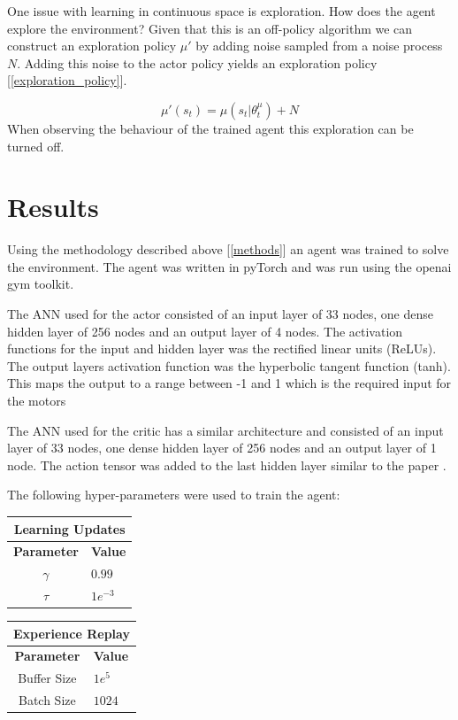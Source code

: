 \documentclass[12pt]{article}
\begin{document}
One issue with learning in continuous space is exploration.
How does the agent explore the environment?
Given that this is an off-policy algorithm we can construct an exploration policy $\mu'$ by adding noise sampled from a noise process $N$.
Adding this noise to the actor policy yields an exploration policy [\ref{exploration_policy}].

\begin{equation}
\label{exploration_policy}
\mu'(s_t) = \mu(s_t|\theta_t^\mu) + N
\end{equation}
When observing the behaviour of the trained agent this exploration can be turned off.

\section{Results}
Using the methodology described above [\ref{methods}] an agent was trained to solve the environment.
The agent was written in pyTorch and was run using the openai gym toolkit.

The ANN used for the actor consisted of an input layer of 33 nodes, one dense hidden layer of 256 nodes and an output layer of 4 nodes.
The activation functions for the input and hidden layer was the rectified linear units (ReLUs). 
The output layers activation function was the hyperbolic tangent function (tanh). 
This maps the output to a range between -1 and 1 which is the required input for the motors

The ANN used for the critic has a similar architecture and consisted of an input layer of 33 nodes, one dense hidden layer of 256 nodes and an output layer of 1 node. The action tensor was added to the last hidden layer similar to the paper \cite{ddpg_paper}.

The following hyper-parameters were used to train the agent:

\begin{table}[h!t]
\begin{minipage}{.5\linewidth}
\begin{tabular}{|c|l|}
	\hline
	\multicolumn{2}{|c|}{\textbf{Learning Updates}}\\
	\hline
	\hline
	\textbf{Parameter} & \textbf{Value}\\
	\hline
	$\gamma$ & $0.99$\\
	$\tau$ & $1e^{-3}$\\
	\hline
\end{tabular}
\end{minipage}
\begin{minipage}{.5\linewidth}
\begin{tabular}{|c|l|}
	\hline
	\multicolumn{2}{|c|}{\textbf{Experience Replay}}\\
	\hline
	\hline
	\textbf{Parameter} & \textbf{Value}\\
	\hline
	Buffer Size & $1e^{5}$\\
	Batch Size & $1024$\\
	\hline
\end{tabular}
\end{minipage}
\end{table}
\end{document}

